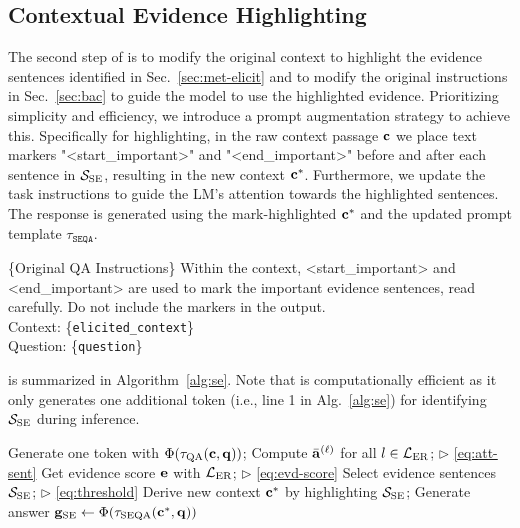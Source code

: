 \subsection{Contextual Evidence Highlighting}
\label{sec:met-highlight}
The second step of \se is to modify the original context to highlight the evidence sentences identified in Sec.~\ref{sec:met-elicit} and to modify the original instructions in Sec.~\ref{sec:bac} to guide the model to use the highlighted evidence. Prioritizing simplicity and efficiency, we introduce a prompt augmentation strategy to achieve this. Specifically for highlighting, in the raw context passage ${\mathbf{c}}$ we place text markers "<start\_important>" and "<end\_important>" before and after each sentence in ${\mathcal{S}}_\text{SE}$, resulting in the new context ${\mathbf{c}}^*$. Furthermore, we update the task instructions to guide the LM's attention towards the highlighted sentences. The response is generated using the mark-highlighted ${\mathbf{c}}^*$ and the updated prompt template $\tau_\texttt{SEQA}$.
\begin{tcolorbox}[title={\footnotesize \se Prompt Template $\tau_\texttt{SEQA}$},top=1mm,bottom=1mm]
\scriptsize
\{Original QA Instructions\}
Within the context, <start\_important> and <end\_important> are used to mark the important evidence sentences, read carefully. Do not include the markers in the output.\\
Context: \{\texttt{elicited\_context}\}\\
Question: \{\texttt{question}\}
\end{tcolorbox}
\se is summarized in Algorithm~\ref{alg:se}.
Note that \se is computationally efficient as it only generates one additional token (i.e., line 1 in Alg.~\ref{alg:se}) for identifying ${\mathcal{S}}_\text{SE}$ during inference.

\begin{algorithm}[H]
\caption{\se}
\label{alg:se}
\renewcommand{\algorithmicrequire}{\textbf{Input}}
\renewcommand{\algorithmicensure}{\textbf{Output:}}
\begin{algorithmic}[1]
    \STATE Generate one token with $\Phi(\tau_\text{QA}({\mathbf{c}}, {\mathbf{q}}))$;
    \STATE Compute ${\bar{\mathbf{a}}}^{(\ell)}$ for all $l \in {\mathcal{L}}_\text{ER}$; \hfill $\rhd$ \eqref{eq:att-sent}
    \STATE Get evidence score ${\mathbf{e}}$ with ${\mathcal{L}}_\text{ER}$; \hfill $\rhd$ \eqref{eq:evd-score}
    \STATE Select evidence sentences ${\mathcal{S}}_\text{SE}$; \hfill $\rhd$ \eqref{eq:threshold}
    \STATE Derive new context ${\mathbf{c}}^*$ by highlighting ${\mathcal{S}}_\text{SE}$;
    \STATE Generate answer ${\mathbf{g}}_\text{SE} \gets \Phi(\tau_\text{SEQA}({\mathbf{c}}^*, {\mathbf{q}}))$
\end{algorithmic}
\end{algorithm}
\vspace{-10pt}




